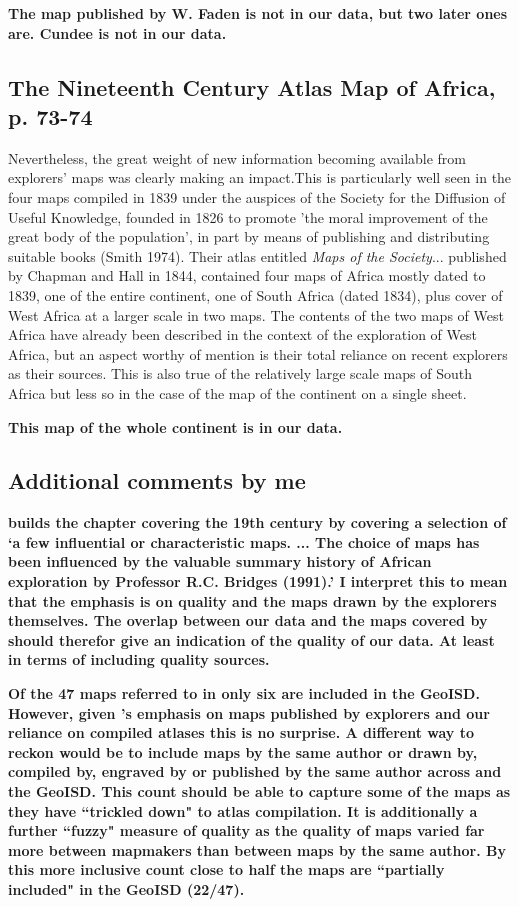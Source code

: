 \documentclass[12pt]{article}
\begin{document}
\textbf{The map published by W. Faden is not in our data, but two later ones
are. Cundee is not in our data.}

\subsection{The Nineteenth Century Atlas Map of Africa, p. 73-74}

Nevertheless, the great weight of new information becoming available from
explorers' maps was clearly making an impact.This is particularly well seen in
the four maps compiled in 1839 under the auspices of the Society for the
Diffusion of Useful Knowledge, founded in 1826 to promote 'the moral improvement
of the great body of the population', in part by means of publishing and
distributing suitable books (Smith 1974). Their atlas entitled \textit{Maps of
the Society}... published by Chapman and Hall in 1844, contained four maps of
Africa mostly dated to 1839, one of the entire continent, one of South Africa
(dated 1834), plus cover of West Africa at a larger scale in two maps. The
contents of the two maps of West Africa have already been described in the
context of the exploration of West Africa, but an aspect worthy of mention is
their total reliance on recent explorers as their sources. This is also true of
the relatively large scale maps of South Africa but less so in the case of the
map of the continent on a single sheet.

\textbf{This map of the whole continent is in our data.}

\subsection{Additional comments by me}

\textbf{\citet{Stone1995} builds the chapter covering the 19th century by
	covering a selection of `a few influential or characteristic maps. ...
	The choice of maps has been influenced by the valuable summary history
	of African exploration by Professor R.C. Bridges (1991).' I interpret
	this to mean that the emphasis is on quality and the maps drawn by the
	explorers themselves. The overlap between our data and the maps covered
	by \citet{Stone1995} should therefor give an indication of the quality
	of our data. At least in terms of including quality sources.}

\textbf{Of the 47 maps referred to in \citet{Stone1995} only six are included in
	the GeoISD. However, given \citet{Stone1995}'s emphasis on maps
	published by explorers and our reliance on compiled atlases this is no
	surprise. A different way to reckon would be to include maps by the same
	author or drawn by, compiled by, engraved by or published by the same
	author across \citet{Stone1995} and the GeoISD. This count should be
	able to capture some of the maps as they have ``trickled down" to atlas
	compilation. It is additionally a further ``fuzzy" measure of quality as
the quality of maps varied far more between mapmakers than between maps by the
same author. By this more inclusive count close to half the maps are ``partially
included" in the GeoISD (22/47).}
	
\end{document}
